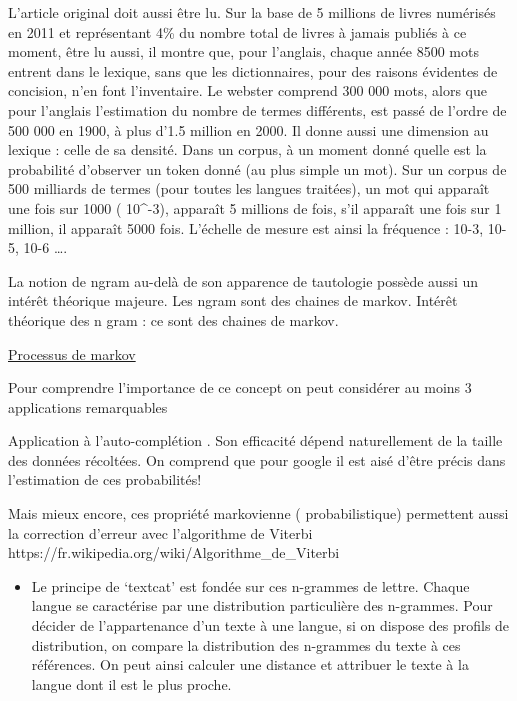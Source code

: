 \documentclass[
  letterpaper,
  DIV=11,
  numbers=noendperiod]{scrreprt}
\providecommand{\tightlist}{%
  \setlength{\itemsep}{0pt}\setlength{\parskip}{0pt}}\usepackage{longtable,booktabs,array}
\begin{document}
L'article original doit aussi être lu. Sur la base de 5 millions de
livres numérisés en 2011 et représentant 4\% du nombre total de livres à
jamais publiés à ce moment, être lu aussi, il montre que, pour
l'anglais, chaque année 8500 mots entrent dans le lexique, sans que les
dictionnaires, pour des raisons évidentes de concision, n'en font
l'inventaire. Le webster comprend 300 000 mots, alors que pour l'anglais
l'estimation du nombre de termes différents, est passé de l'ordre de 500
000 en 1900, à plus d'1.5 million en 2000. Il donne aussi une dimension
au lexique : celle de sa densité. Dans un corpus, à un moment donné
quelle est la probabilité d'observer un token donné (au plus simple un
mot). Sur un corpus de 500 milliards de termes (pour toutes les langues
traitées), un mot qui apparaît une fois sur 1000 ( 10\^{}-3), apparaît 5
millions de fois, s'il apparaît une fois sur 1 million, il apparaît 5000
fois. L'échelle de mesure est ainsi la fréquence : 10-3, 10-5, 10-6
\ldots.

La notion de ngram au-delà de son apparence de tautologie possède aussi
un intérêt théorique majeure. Les ngram sont des chaines de markov.
Intérêt théorique des n gram : ce sont des chaines de markov.

\href{https://fr.wikipedia.org/wiki/N-gramme}{Processus de markov}

Pour comprendre l'importance de ce concept on peut considérer au moins 3
applications remarquables

Application à l'auto-complétion . Son efficacité dépend naturellement de
la taille des données récoltées. On comprend que pour google il est aisé
d'être précis dans l'estimation de ces probabilités!

Mais mieux encore, ces propriété markovienne ( probabilistique)
permettent aussi la correction d'erreur avec l'algorithme de Viterbi
https://fr.wikipedia.org/wiki/Algorithme\_de\_Viterbi

\begin{itemize}
\tightlist
\item
  Le principe de `textcat' est fondée sur ces n-grammes de lettre.
  Chaque langue se caractérise par une distribution particulière des
  n-grammes. Pour décider de l'appartenance d'un texte à une langue, si
  on dispose des profils de distribution, on compare la distribution des
  n-grammes du texte à ces références. On peut ainsi calculer une
  distance et attribuer le texte à la langue dont il est le plus proche.
\end{itemize}
\end{document}
